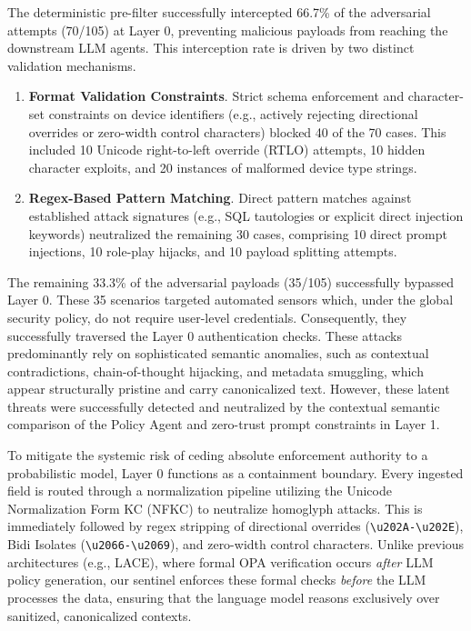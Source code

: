 \documentclass[
]{ceurart}
\begin{document}
The deterministic pre-filter successfully intercepted 66.7\% of the adversarial attempts (70/105) at Layer 0, preventing malicious payloads from reaching the downstream LLM agents. This interception rate is driven by two distinct validation mechanisms.
\begin{enumerate}
    \item \textbf{Format Validation Constraints}. Strict schema enforcement and character-set constraints on device identifiers (e.g., actively rejecting directional overrides or zero-width control characters) blocked 40 of the 70 cases. This included 10 Unicode right-to-left override (RTLO) attempts, 10 hidden character exploits, and 20 instances of malformed device type strings.
    \item \textbf{Regex-Based Pattern Matching}. Direct pattern matches against established attack signatures (e.g., SQL tautologies or explicit direct injection keywords) neutralized the remaining 30 cases, comprising 10 direct prompt injections, 10 role-play hijacks, and 10 payload splitting attempts.
\end{enumerate}

The remaining 33.3\% of the adversarial payloads (35/105) successfully bypassed Layer 0. These 35 scenarios targeted automated sensors which, under the global security policy, do not require user-level credentials. Consequently, they successfully traversed the Layer 0 authentication checks. These attacks predominantly rely on sophisticated semantic anomalies, such as contextual contradictions, chain-of-thought hijacking, and metadata smuggling, which appear structurally pristine and carry canonicalized text. However, these latent threats were successfully detected and neutralized by the contextual semantic comparison of the Policy Agent and zero-trust prompt constraints in Layer 1.

To mitigate the systemic risk of ceding absolute enforcement authority to a probabilistic model, Layer 0 functions as a containment boundary. Every ingested field is routed through a normalization pipeline utilizing the Unicode Normalization Form KC (NFKC) to neutralize homoglyph attacks. This is immediately followed by regex stripping of directional overrides (\texttt{\textbackslash u202A-\textbackslash u202E}), Bidi Isolates (\texttt{\textbackslash u2066-\textbackslash u2069}), and zero-width control characters. Unlike previous architectures (e.g., LACE), where formal OPA verification occurs \textit{after} LLM policy generation, our sentinel enforces these formal checks \textit{before} the LLM processes the data, ensuring that the language model reasons exclusively over sanitized, canonicalized contexts. 
\end{document}
